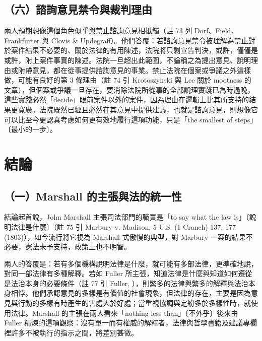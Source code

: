 \subsection{（六）諮詢意見禁令與裁判理由}

兩人預期想像這個角色似乎與禁止諮詢意見相抵觸（註 73 列 Dorf、Field、Frankfurter 與 Clovis \& Updegraff）。他們答覆：若諮詢意見禁令被理解為禁止對於案件結果不必要的、關於法律的有用陳述，法院將只剩宣告判決，或許，僅僅是或許，附上案件事實的陳述。法院一旦超出此範圍，不論稱之為提出意見、說明理由或附帶意見，都在從事提供諮詢意見的事業。禁止法院在個案或爭議之外這樣做，可能有良好的第 3 條理由（註 74 引 Krotoszynski 與 Lee 關於 mootness 的文章），但個案或爭議一旦存在，要消除法院所從事的全部說理實踐已為時過晚，這些實踐必然「decide」眼前案件以外的案件，因為理由在邏輯上比其所支持的結果更寬廣。法院既然已經且必然在其意見中提供建議，也就是諮詢意見，則想像它可以比至今更認真考慮如何更有效地履行這項功能，只是「the smallest of steps」〔最小的一步〕。

\section{結論}
\label{sec:AS-5}

\subsection{（一）Marshall 的主張與法的統一性}

結論起首說，John Marshall 主張司法部門的職責是「to say what the law is」〔說明法律是什麼〕（註 75 引 Marbury v. Madison, 5 U.S. (1 Cranch) 137, 177 (1803)），如今流行將它視為 Marshall 式傲慢的典型，對 Marbury 一案的結果不必要，憲法未予支持，政策上也不明智。

兩人的答覆是：若有多個機構說明法律是什麼，就可能有多部法律，更準確地說，對同一部法律有多種解釋。若如 Fuller 所主張，知道法律是什麼與知道如何遵從是法治本身的必要條件（註 77 引 Fuller, ），則繁多的法律與繁多的解釋與法治本身相悖。他們承認意見的多樣是有價值的社會現象，但法律的存在，主要是因為意見與行動的多樣有時產生的害處大於好處；當重視協調與定紛多於多樣性時，就使用法律。Marshall 的主張在兩人看來「nothing less than」〔不外乎〕後來由 Fuller 精煉的這項觀察：沒有單一而有權威的解釋者，法律與哲學書籍及建議專欄裡許多不被執行的指示之間，將差別甚微。

